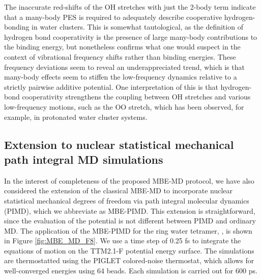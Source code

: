 \documentclass[11pt, proquest]{uwthesis}[2020/02/24]
\let\ce\ch
\begin{document}
\par The inaccurate red-shifts of the OH stretches with just the 2-body term indicate that a many-body PES is required to adequately describe cooperative hydrogen-bonding in water clusters. This is somewhat tautological, as the definition of hydrogen bond cooperativity is the presence of large many-body contributions to the binding energy, but nonetheless confirms what one would suspect in the context of vibrational frequency shifts rather than binding energies. These frequency deviations seem to reveal an underappreciated trend, which is that many-body effects seem to stiffen the low-frequency dynamics relative to a strictly pairwise additive potential. One interpretation of this is that hydrogen-bond cooperativity strengthens the coupling between OH stretches and various low-frequency motions, such as the OO stretch, which has been observed, for example, in protonated water cluster systems.\autocite{duong_tag-free_2018}

\subsection{Extension to nuclear statistical mechanical path integral MD simulations}

\par In the interest of completeness of the proposed MBE-MD protocol, we have also considered the extension of the classical MBE-MD to incorporate nuclear statistical mechanical degrees of freedom via path integral molecular dynamics (PIMD),\autocite{chandler_exploiting_1981,feynman_quantum_2010} which we abbreviate as MBE-PIMD. This extension is straightforward, since the evaluation of the potential is not different between PIMD and ordinary MD. The application of the MBE-PIMD for the ring water tetramer, \ce{(H2O)4}, is shown in Figure \ref{fig:MBE_MD_F8}. We use a time step of 0.25 fs to integrate the equations of motion on the TTM2.1-F potential energy surface. The simulations are thermostatted using the PIGLET colored-noise thermostat\autocite{ceriotti_efficient_2012}, which allows for well-converged energies using 64 beads. Each simulation is carried out for 600 ps.
\end{document}
